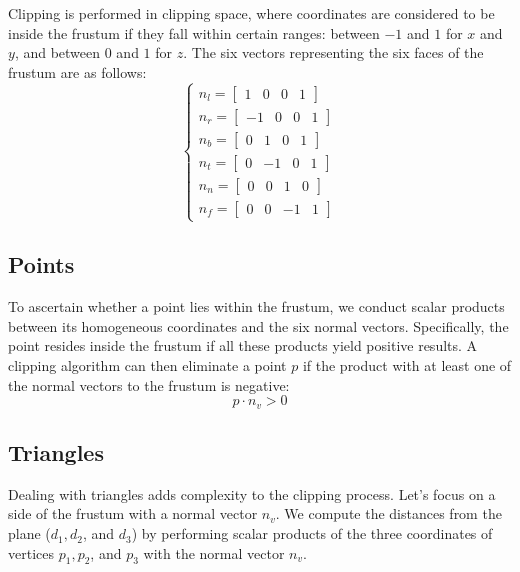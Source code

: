 Clipping is performed in clipping space, where coordinates are considered to be inside the frustum if they fall within certain ranges: between $-1$ and $1$ for $x$ and $y$, and between $0$ and $1$ for $z$. 
The six vectors representing the six faces of the frustum are as follows:
\[\begin{cases}
    n_l=\begin{bmatrix} 1 & 0 & 0 & 1 \end{bmatrix} \\ 
    n_r=\begin{bmatrix} -1 & 0 & 0 & 1 \end{bmatrix} \\
    n_b=\begin{bmatrix} 0 & 1 & 0 & 1 \end{bmatrix} \\
    n_t=\begin{bmatrix} 0 & -1 & 0 & 1 \end{bmatrix} \\ 
    n_n=\begin{bmatrix} 0 & 0 & 1 & 0 \end{bmatrix} \\ 
    n_f=\begin{bmatrix} 0 & 0 & -1 & 1 \end{bmatrix}
\end{cases}\]

\subsection{Points}
To ascertain whether a point lies within the frustum, we conduct scalar products between its homogeneous coordinates and the six normal vectors. 
Specifically, the point resides inside the frustum if all these products yield positive results.
A clipping algorithm can then eliminate a point $p$ if the product with at least one of the normal vectors to the frustum is negative:
\[p\cdot n_v>0\]

\subsection{Triangles}
Dealing with triangles adds complexity to the clipping process. Let's focus on a side of the frustum with a normal vector $n_v$. 
We compute the distances from the plane ($d_1,d_2$, and $d_3$) by performing scalar products of the three coordinates of vertices $p_1,p_2$, and $p_3$ with the normal vector $n_v$.


